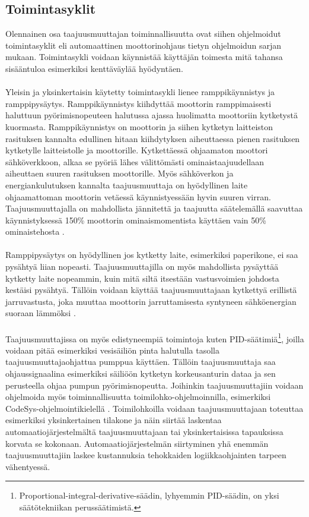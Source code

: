 \documentclass[finnish,12pt,a4paper,pdftex,elec,utf8]{aaltothesis}
\begin{document}

\subsection{Toimintasyklit}
Olennainen osa taajuusmuuttajan toiminnallisuutta ovat siihen ohjelmoidut toimintasyklit eli automaattinen moottorinohjaus tietyn ohjelmoidun sarjan mukaan. Toimintasykli voidaan käynnistää käyttäjän toimesta mitä tahansa sisääntuloa esimerkiksi kenttäväylää hyödyntäen. 
\\\\
Yleisin ja yksinkertaisin käytetty toimintasykli lienee ramppikäynnistys ja ramppipysäytys. Ramppikäynnistys kiihdyttää moottorin ramppimaisesti haluttuun pyörimisnopeuteen halutussa ajassa huolimatta moottoriin kytketystä kuormasta.
Ramppikäynnistys on moottorin ja siihen kytketyn laitteiston rasituksen kannalta edullinen hitaan kiihdytyksen aiheuttaessa pienen rasituksen kytketylle laitteistolle ja moottorille. Kytkettäessä ohjaamaton moottori sähköverkkoon, alkaa se pyöriä lähes välittömästi ominaistaajuudellaan aiheuttaen suuren rasituksen moottorille. Myös sähköverkon ja energiankulutuksen kannalta taajuusmuuttaja on hyödyllinen laite ohjaamattoman moottorin vetäessä käynnistyessään hyvin suuren virran. Taajuusmuuttajalla on mahdollista jännitettä ja taajuutta säätelemällä saavuttaa käynnistyksessä 150\% moottorin ominaismomentista käyttäen vain 50\% ominaistehosta \cite{ABBtechnicalguide}.
\\\\
Ramppipysäytys on hyödyllinen jos kytketty laite, esimerkiksi paperikone, ei saa pysähtyä liian nopeasti. Taajuusmuuttajilla on myös mahdollista pysäyttää kytketty laite nopeammin, kuin mitä siltä itsestään vastusvoimien johdosta kestäisi pysähtyä. Tällöin voidaan käyttää taajuusmuuttajaan kytkettyä erillistä jarruvastusta, joka muuttaa moottorin jarruttamisesta syntyneen sähköenergian suoraan lämmöksi \cite{ABBtechnicalguide}.
\\\\
Taajuusmuuttajissa on myös edistyneempiä toimintoja kuten PID-säätimiä\footnote{Proportional-integral-derivative-säädin, lyhyemmin PID-säädin, on yksi säätötekniikan perussäätimistä.}, joilla voidaan pitää esimerkiksi vesisäiliön pinta halutulla tasolla taajuusmuuttajaohjattua pumppua käyttäen. Tällöin taajuusmuuttaja saa ohjaussignaalina esimerkiksi säiliöön kytketyn korkeusanturin dataa ja sen perusteella ohjaa pumpun pyörimisnopeutta. Joihinkin taajuusmuuttajiin voidaan ohjelmoida myös toiminnallisuutta toimilohko-ohjelmoinnilla, esimerkiksi CodeSys-ohjelmointikielellä \cite{MyyntiHaastattelu}. Toimilohkoilla voidaan taajuusmuuttajaan toteuttaa esimerkiksi yksinkertainen tilakone ja näin siirtää laskentaa automaatiojärjestelmältä taajuusmuuttajaan tai yksinkertaisissa tapauksissa korvata se kokonaan. Automaatiojärjestelmän siirtyminen yhä enemmän taajuusmuuttajiin laskee kustannuksia tehokkaiden logiikkaohjainten tarpeen vähentyessä.
\end{document}
